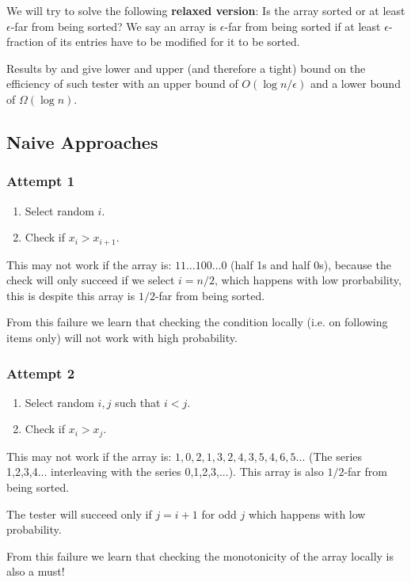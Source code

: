 We will try to solve the following \textbf{relaxed version}: Is the array sorted or at least $\epsilon$-far from being sorted?
We say an array is $\epsilon$-far from being sorted if at least $\epsilon$-fraction of its entries have to be modified for it to be sorted.

Results by \cite{ergun2000spot} and \cite{fischer2004strength} give lower and upper (and therefore a tight) bound on the efficiency of such tester with an upper bound of $O(\log n / \epsilon)$ and a lower bound of $\Omega(\log n)$.

\subsection{Naive Approaches}
\subsubsection{Attempt 1}
\begin{enumerate}
    \item Select random $i$.
    \item Check if $x_i > x_{i+1}$.
\end{enumerate}

This may not work if the array is: $11\ldots 100\ldots 0$ (half 1s and half 0s), because the check will only succeed if we select $i=n/2$, which happens with low prorbability, this is despite this array is $1/2$-far from being sorted.

From this failure we learn that checking the condition locally (i.e. on following items only) will not work with high probability.

\subsubsection{Attempt 2}
\begin{enumerate}
    \item Select random $i,j$ such that $i<j$.
    \item Check if $x_i > x_j$.
\end{enumerate}

This may not work if the array is: $1,0,2,1,3,2,4,3,5,4,6,5...$ (The series 1,2,3,4... interleaving with the series 0,1,2,3,...).
This array is also $1/2$-far from being sorted.

The tester will succeed only if $j=i+1$ for odd $j$ which happens with low probability.

From this failure we learn that checking the monotonicity of the array locally is also a must!

